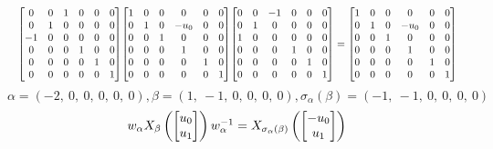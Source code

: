 \documentclass[11pt]{article}
\theoremstyle{definition}
\begin{document}
\[
\scaletoalign{\textwidth}{{\left[\begin{matrix}0 & 0 & 1 & 0 & 0 & 0\\0 & 1 & 0 & 0 & 0 & 0\\-1 & 0 & 0 & 0 & 0 & 0\\0 & 0 & 0 & 1 & 0 & 0\\0 & 0 & 0 & 0 & 1 & 0\\0 & 0 & 0 & 0 & 0 & 1\end{matrix}\right]} {\left[\begin{matrix}1 & 0 & 0 & 0 & 0 & 0\\0 & 1 & 0 & - u_{0} & 0 & 0\\0 & 0 & 1 & 0 & 0 & 0\\0 & 0 & 0 & 1 & 0 & 0\\0 & 0 & 0 & 0 & 1 & 0\\0 & 0 & 0 & 0 & 0 & 1\end{matrix}\right]} {\left[\begin{matrix}0 & 0 & -1 & 0 & 0 & 0\\0 & 1 & 0 & 0 & 0 & 0\\1 & 0 & 0 & 0 & 0 & 0\\0 & 0 & 0 & 1 & 0 & 0\\0 & 0 & 0 & 0 & 1 & 0\\0 & 0 & 0 & 0 & 0 & 1\end{matrix}\right]} = {\left[\begin{matrix}1 & 0 & 0 & 0 & 0 & 0\\0 & 1 & 0 & - u_{0} & 0 & 0\\0 & 0 & 1 & 0 & 0 & 0\\0 & 0 & 0 & 1 & 0 & 0\\0 & 0 & 0 & 0 & 1 & 0\\0 & 0 & 0 & 0 & 0 & 1\end{matrix}\right]}}
\]
\[
\alpha = \left( -2, \  0, \  0, \  0, \  0, \  0\right), \beta = \left( 1, \  -1, \  0, \  0, \  0, \  0\right), \sigma_{\alpha}(\beta) = \left( -1, \  -1, \  0, \  0, \  0, \  0\right)
\]
\[
\scaletoalign{\textwidth}{w_{\alpha} X_{\beta}\left(\left[\begin{matrix}u_{0}\\u_{1}\end{matrix}\right]\right) w_{\alpha}^{-1} = X_{\sigma_{\alpha}\left(\beta\right)}\left(\left[\begin{matrix}- u_{0}\\u_{1}\end{matrix}\right]\right)}
\]
\end{document}
